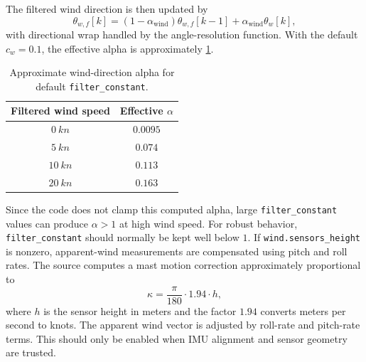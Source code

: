 \documentclass[11pt,twocolumn]{article}
\begin{document}
The filtered wind direction is then updated by
\[
\theta_{w,f}[k]
=
(1-\alpha_{\mathrm{wind}})\theta_{w,f}[k-1]
+
\alpha_{\mathrm{wind}}\theta_w[k],
\]
with directional wrap handled by the angle-resolution function.
With the default \(c_w=0.1\), the effective alpha is approximately
\cref{tab:pypilot-wind-alpha}.
\begin{table}[h]
\centering
\caption{Approximate wind-direction alpha for default \texttt{filter\_constant}.}
\label{tab:pypilot-wind-alpha}
\begin{tabular}{cc}
\toprule
Filtered wind speed & Effective \(\alpha\) \\
\midrule
\(\SI{0}{kn}\)  & \(\num{0.0095}\) \\
\(\SI{5}{kn}\)  & \(\num{0.074}\) \\
\(\SI{10}{kn}\) & \(\num{0.113}\) \\
\(\SI{20}{kn}\) & \(\num{0.163}\) \\
\bottomrule
\end{tabular}
\end{table}
Since the code does not clamp this computed alpha, large
\texttt{filter\_constant} values can produce \(\alpha>1\) at high wind
speed.  For robust behavior, \texttt{filter\_constant} should normally be
kept well below \(1\).
If \texttt{wind.sensors\_height} is nonzero, apparent-wind measurements
are compensated using pitch and roll rates.  The source computes a mast
motion correction approximately proportional to
\[
\kappa
=
\frac{\pi}{180}
\cdot
1.94
\cdot
h,
\]
where \(h\) is the sensor height in meters and the factor \(1.94\)
converts meters per second to knots.  The apparent wind vector is adjusted
by roll-rate and pitch-rate terms.  This should only be enabled when IMU
alignment and sensor geometry are trusted.
\end{document}
